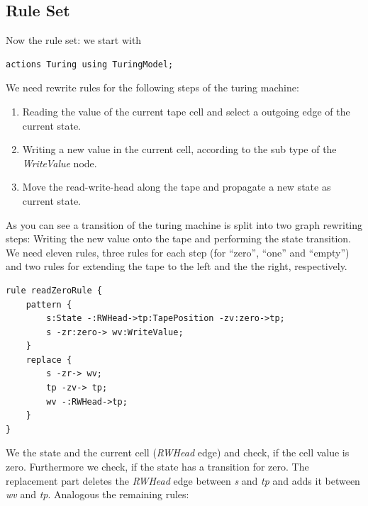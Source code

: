 \subsection{Rule Set}
Now the rule set: we start with
\lstset{language=grgenactions}
\begin{lstlisting}[name=grg] 
actions Turing using TuringModel;
\end{lstlisting}
We need rewrite rules for the following steps of the turing machine:
\begin{enumerate}
  \item Reading the value of the current tape cell and select a outgoing edge of the current state.
  \item Writing a new value in the current cell, according to the sub type of the \emph{WriteValue} node.
  \item Move the read-write-head along the tape and propagate a new state as current state. 
\end{enumerate}
As you can see a transition of the turing machine is split into two graph rewriting steps: Writing the new value onto the tape and performing the state transition. We need eleven rules, three rules for each step (for ``zero'', ``one'' and ``empty'') and two rules for extending the tape to the left and the the right, respectively.
\begin{lstlisting}[name=grg] 
rule readZeroRule {
	pattern {
		s:State -:RWHead->tp:TapePosition -zv:zero->tp;
		s -zr:zero-> wv:WriteValue;
	}
	replace {
		s -zr-> wv;
		tp -zv-> tp;
		wv -:RWHead->tp;
	}
}      
\end{lstlisting}
We the state and the current cell (\emph{RWHead} edge) and check, if the cell value is zero. Furthermore we check, if the state has a transition for zero. The replacement part deletes the \emph{RWHead} edge between \emph{s} and \emph{tp} and adds it between \emph{wv} and \emph{tp}. Analogous the remaining rules:
